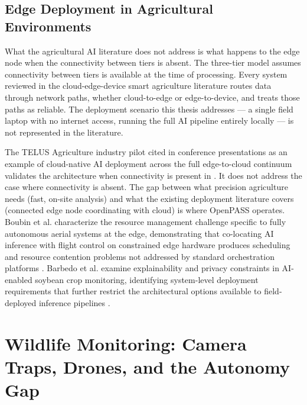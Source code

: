 \subsection{Edge Deployment in Agricultural Environments}
\label{sec:egde_deploy}
What the agricultural AI literature does not address is what happens to the edge node when the connectivity between tiers is absent. The three-tier model assumes connectivity between tiers is available at the time of processing. Every system reviewed in the cloud-edge-device smart agriculture literature routes data through network paths, whether cloud-to-edge or edge-to-device, and treats those paths as reliable. The deployment scenario this thesis addresses — a single field laptop with no internet access, running the full AI pipeline entirely locally — is not represented in the literature.

The TELUS Agriculture industry pilot cited in conference presentations as an example of cloud-native AI deployment across the full edge-to-cloud continuum validates the architecture when connectivity is present in \cite{gu2025cloudedge}. It does not address the case where connectivity is absent. The gap between what precision agriculture needs (fast, on-site analysis) and what the existing deployment literature covers (connected edge node coordinating with cloud) is where OpenPASS operates. Boubin et al. characterize the resource management challenge specific to fully autonomous aerial systems at the edge, demonstrating that co-locating AI inference with flight control on constrained edge hardware produces scheduling and resource contention problems not addressed by standard orchestration platforms \cite{boubin2019managing}. Barbedo et al. examine explainability and privacy constraints in AI-enabled soybean crop monitoring, identifying system-level deployment requirements that further restrict the architectural options available to field-deployed inference pipelines \cite{barbedo2026explainability}.

\section{Wildlife Monitoring: Camera Traps, Drones, and the Autonomy Gap}
\label{sec:wildlife_monitoring}
